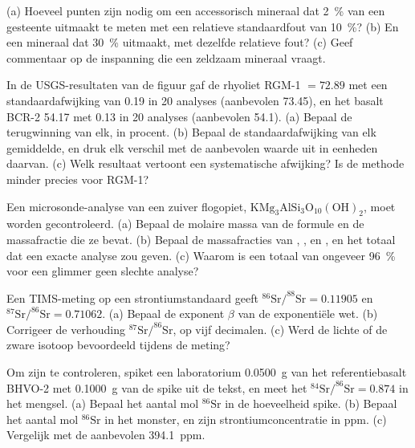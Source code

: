 \begin{exercise}[$\star\star$]\label{exo:b2:field-lab-methods-2:5}
(a) Hoeveel punten zijn nodig om een accessorisch mineraal dat \qty{2}{\percent} van een gesteente uitmaakt te meten
met een relatieve standaardfout van \qty{10}{\percent}? (b) En een mineraal dat \qty{30}{\percent} uitmaakt,
met dezelfde relatieve fout? (c) Geef commentaar op de inspanning die een zeldzaam mineraal vraagt.
\end{exercise}

\begin{exercise}[$\star\star$]\label{exo:b2:field-lab-methods-2:6}
In de USGS-resultaten van de figuur gaf de rhyoliet RGM-1  $= 72.89$ met een
standaardafwijking van 0.19 in 20 analyses (aanbevolen 73.45), en het basalt BCR-2 54.17 met 0.13 in
20 analyses (aanbevolen 54.1). (a) Bepaal de terugwinning van elk, in procent. (b) Bepaal de
standaardafwijking van elk gemiddelde, en druk elk verschil met de aanbevolen waarde uit in eenheden daarvan.
(c) Welk resultaat vertoont een systematische afwijking? Is de methode minder precies voor RGM-1?
\end{exercise}

\begin{exercise}[$\star\star$]\label{exo:b2:field-lab-methods-2:7}
Een microsonde-analyse van een zuiver flogopiet, $\mathrm{KMg_3AlSi_3O_{10}(OH)_2}$, moet worden gecontroleerd.
(a) Bepaal de molaire massa van de formule en de massafractie  die ze bevat. (b) Bepaal de
massafracties van , ,  en , en het totaal dat een exacte analyse zou
geven. (c) Waarom is een totaal van ongeveer \qty{96}{\percent} voor een glimmer geen slechte analyse?
\end{exercise}

\begin{exercise}[$\star\star$]\label{exo:b2:field-lab-methods-2:8}
Een TIMS-meting op een strontiumstandaard geeft $^{86}\mathrm{Sr}/^{88}\mathrm{Sr} = 0.11905$ en
$^{87}\mathrm{Sr}/^{86}\mathrm{Sr} = 0.71062$. (a) Bepaal de exponent $\beta$ van de exponentiële wet.
(b) Corrigeer de verhouding $^{87}\mathrm{Sr}/^{86}\mathrm{Sr}$, op vijf decimalen. (c) Werd de lichte of
de zware isotoop bevoordeeld tijdens de meting?
\end{exercise}

\begin{exercise}[$\star\star$]\label{exo:b2:field-lab-methods-2:9}
Om zijn  te controleren, spiket een laboratorium \qty{0.0500}{g} van het referentiebasalt BHVO-2
met \qty{0.1000}{g} van de spike uit de tekst, en meet het $^{84}\mathrm{Sr}/^{86}\mathrm{Sr} =
0.874$ in het mengsel. (a) Bepaal het aantal mol $^{86}\mathrm{Sr}$ in de hoeveelheid spike. (b) Bepaal het
aantal mol $^{86}\mathrm{Sr}$ in het monster, en zijn strontiumconcentratie in ppm. (c) Vergelijk met
de aanbevolen \qty{394.1}{ppm}.
\end{exercise}

